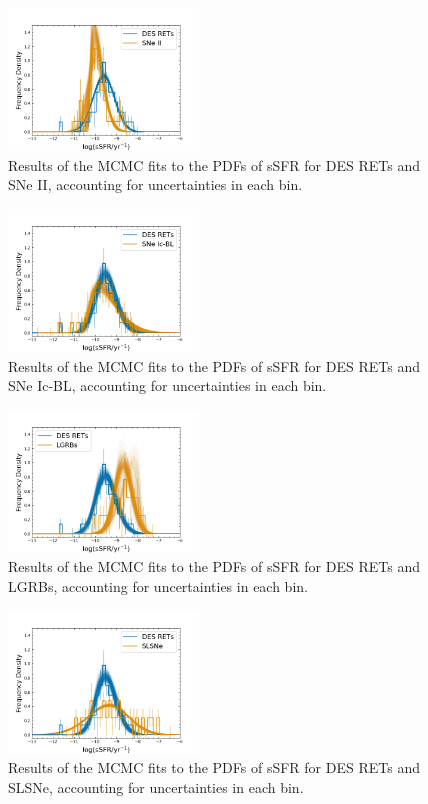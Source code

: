 \documentclass[fleqn,usenatbib,]{mnras}
\begin{document}
\begin{figure}
\includegraphics[width=0.45\textwidth]{mc_figs/rets_s13_histfit_ssfr_final.png}
\caption{Results of the MCMC fits to the PDFs of sSFR for DES RETs and SNe II, accounting for uncertainties in each bin.
\label{fig:histfit_ssfr_s13}}
\end{figure}
\begin{figure}
\includegraphics[width=0.45\textwidth]{mc_figs/rets_m19_histfit_ssfr_final.png}
\caption{Results of the MCMC fits to the PDFs of sSFR for DES RETs and SNe Ic-BL, accounting for uncertainties in each bin.
\label{fig:histfit_ssfr_m19}}
\end{figure}
\begin{figure}
\includegraphics[width=0.45\textwidth]{mc_figs/rets_k15_histfit_ssfr_final.png}
\caption{Results of the MCMC fits to the PDFs of sSFR for DES RETs and LGRBs, accounting for uncertainties in each bin.
\label{fig:histfit_ssfr_k15}}
\end{figure}
\begin{figure}
\includegraphics[width=0.45\textwidth]{mc_figs/rets_p16_histfit_ssfr_final.png}
\caption{Results of the MCMC fits to the PDFs of sSFR for DES RETs and SLSNe, accounting for uncertainties in each bin.
\label{fig:histfit_ssfr_p16}}
\end{figure}
\end{document}
